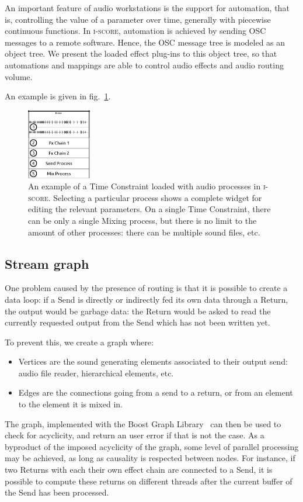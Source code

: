 \documentclass{article}
\newcommand*{\iscore}{\textsc{i-score}\xspace}
\begin{document}
An important feature of audio workstations is the support for automation, that is, 
controlling the value of a parameter over time, generally with piecewise continuous functions.
In \iscore, automation is achieved by sending OSC messages to a remote software.
Hence, the OSC message tree is modeled as an object tree.
We present the loaded effect plug-ins to this object tree, so that automations 
and mappings are able to control audio effects and audio routing volume.

An example is given in fig.~\ref{fig.iscoreconstraint}.
\begin{figure}
	\centering
	\includegraphics[width=0.25\textwidth]{figures/iscore1.eps}
	\caption{An example of a Time Constraint loaded with audio processes in \iscore. 
		Selecting a particular process shows a complete widget for editing the relevant parameters. On a single Time Constraint, there can be only a single Mixing process, but there is no limit to the amount of other processes: there can be multiple sound files, etc.}
	\label{fig.iscoreconstraint}
\end{figure}
\subsection{Stream graph}
One problem caused by the presence of routing is that it is possible 
to create a data loop: if a Send is directly or indirectly fed its own data through a Return, 
the output would be garbage data: the Return would be asked to read 
the currently requested output from the Send which has not been written yet.

To prevent this, we create a graph where: 
\begin{itemize}
	\item Vertices are the sound generating elements associated to their output send: audio file reader, hierarchical elements, etc.
	\item Edges are the connections going from a send to a return, or from an element to the element it is mixed in.
\end{itemize} 

The graph, implemented with the Boost Graph Library~\cite{siek2001boost} can then be used to 
check for acyclicity, and return an user error if that is not the case.
As a byproduct of the imposed acyclicity of the graph, some level of parallel processing may be achieved, as long as causality is respected between nodes. 
For instance, if two Returns with each their own effect chain are connected to a Send, it is possible to compute these returns on different threads after the current buffer of the Send has been processed.
\end{document}
